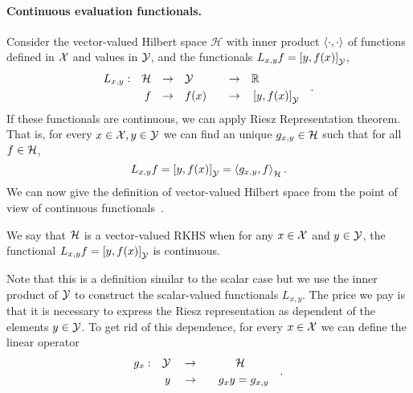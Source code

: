 \paragraph*{Continuous evaluation functionals.}
Consider the vector-valued Hilbert space $\mathcal{H}$ with inner product $\left\langle \cdot, \cdot \right\rangle$ of functions defined in $\mathcal{X}$ and values in $\mathcal{Y}$, and the functionals $L_{x, y} f = \left[ y, f(x) \right]_\mathcal{Y}$,
\begin{equation*}
    \begin{aligned}
        L_{x, y}:&&\mathcal{H}& &\to& &&\mathcal{Y}&& &\to& &&\mathbb{R}& & \\
        &&f& &\to& &&f(x)&& &\to& &&\left[ y, f(x) \right]_\mathcal{Y}& &
    \end{aligned}.
\end{equation*}
If these functionals are continuous, we can apply Riesz Representation theorem. That is, for every $x \in \mathcal{X}, y \in \mathcal{Y}$ we can find an unique $g_{x, y} \in \mathcal{H}$ such that for all $f \in \mathcal{H}$,
\begin{equation}\label{eq:vector_riesz}
    L_{x, y} f = \ydotp{y}{f(x)} = \dotp{g_{x,y}}{f}_{\hilbertspace} .
\end{equation}
We can now give the definition of vector-valued Hilbert space from the point of view of continuous functionals~\citet[Definition 2.1]{MicchelliP05}.
\begin{definition}
    We say that $\mathcal{H}$ is a vector-valued RKHS when for any $x \in \mathcal{X}$ and $y \in \mathcal{Y}$, the functional $L_{x, y} f = \left[ y, f(x) \right]_\mathcal{Y}$ is continuous.
\end{definition}
Note that this is a definition similar to the scalar case but we use the inner product of $\mathcal{Y}$ to construct the scalar-valued functionals $L_{x, y}$. The price we pay is that it is necessary to express the Riesz representation as dependent of the elements $y \in \mathcal{Y}$. To get rid of this dependence, for every $x \in \mathcal{X}$ we can define the linear operator
\begin{equation*}
    \begin{aligned}
        g_x: &&\mathcal{Y}&& &\to& &&&\mathcal{H}&& \\
             && y&&      &\to& &&g_x y &= g_{x, y} &&
    \end{aligned}.
\end{equation*}
